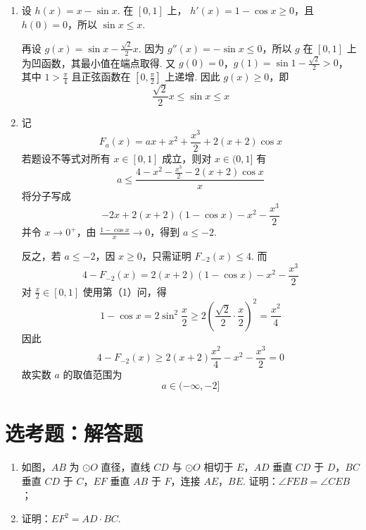 \begin{solution}
\begin{enumerate}
\item 设 \(h(x)=x-\sin x\). 在 \([0,1]\) 上，
\(h'(x)=1-\cos x\geqslant0\)，且 \(h(0)=0\)，所以 \(\sin x\leqslant x\).

再设 \(g(x)=\sin x-\frac{\sqrt2}{2}x\). 因为
\(g''(x)=-\sin x\leqslant0\)，所以 \(g\) 在 \([0,1]\) 上为凹函数，其最小值在端点取得. 又
\(g(0)=0\)，\(g(1)=\sin1-\frac{\sqrt2}{2}>0\)，
其中 \(1>\frac\pi4\) 且正弦函数在 \([0,\frac\pi2]\) 上递增. 因此 \(g(x)\geqslant0\)，即
\[
\frac{\sqrt2}{2}x\leqslant\sin x\leqslant x
\]

\item 记
\[
F_a(x)=ax+x^2+\frac{x^3}{2}+2(x+2)\cos x
\]
若题设不等式对所有 \(x\in[0,1]\) 成立，则对 \(x\in(0,1]\) 有
\[
a\leqslant \frac{4-x^2-\frac{x^3}{2}-2(x+2)\cos x}{x}
\]
将分子写成
\[
-2x+2(x+2)(1-\cos x)-x^2-\frac{x^3}{2}
\]
并令 \(x\to0^+\)，由 \(\frac{1-\cos x}{x}\to0\)，得到 \(a\leqslant-2\).

反之，若 \(a\leqslant-2\)，因 \(x\geqslant0\)，只需证明 \(F_{-2}(x)\leqslant4\). 而
\[
4-F_{-2}(x)=2(x+2)(1-\cos x)-x^2-\frac{x^3}{2}
\]
对 \(\frac{x}{2}\in[0,1]\) 使用第（1）问，得
\[
1-\cos x=2\sin^2\frac{x}{2}
 \geqslant2\left(\frac{\sqrt2}{2}\cdot\frac{x}{2}\right)^2
 =\frac{x^2}{4}
\]
因此
\[
4-F_{-2}(x)
 \geqslant2(x+2)\frac{x^2}{4}-x^2-\frac{x^3}{2}=0
\]
故实数 \(a\) 的取值范围为
\[
a\in(-\infty,-2]
\]
\end{enumerate}
\end{solution}

\section{选考题：解答题}

\begin{problem}
\begin{enumerate}
\item 如图，\(AB\) 为 \(\odot O\) 直径，直线 \(CD\) 与 \(\odot O\) 相切于 \(E\)，\(AD\) 垂直 \(CD\) 于 \(D\)，\(BC\) 垂直 \(CD\) 于 \(C\)，\(EF\) 垂直 \(AB\) 于 \(F\)，连接 \(AE\)，\(BE\). 证明：\(\angle FEB = \angle CEB\)；
\item 证明：\(EF^{2} = AD\cdot BC\).
\end{enumerate}
\end{problem}

